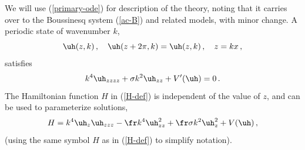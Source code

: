 \documentclass[10pt]{article}
\begin{document}
We will use (\ref{primary-ode}) for description of the theory, noting that it
carries over to the Boussinesq system (\ref{ac-B}) and related models, with
minor change. A periodic state of wavenumber $k$,
%
\begin{equation}\label{periodic-state-scalar}
\uh(z,k)\,,\quad \uh(z+2\pi,k)=\uh(z,k)\,,\quad z=kx\,,
\end{equation}
%
satisfies
%
\begin{equation}\label{ode-k}
  k^4 \uh_{zzzz} + \sigma k^2 \uh_{zz} + V'(\uh) = 0 \,.
\end{equation}
%
The Hamiltonian function $H$ in (\ref{H-def}) is independent of the value of
$z$, and can be used to parameterize solutions,
%
\begin{equation}\label{H-def-k-SH}
H = k^4\uh_z\uh_{zzz} - \fr k^4\uh_{zz}^2 + \fr \sigma k^2 \uh_z^2 + V(\uh)\,,
\end{equation}
%
(using the same symbol $H$ as in (\ref{H-def}) to simplify notation).
\end{document}
